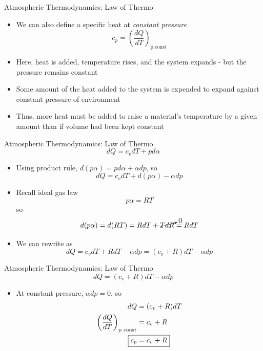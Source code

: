\begin{frame}{Atmospheric Thermodynamics:  Law of Thermo}
\begin{itemize}
	\item We can also define a specific heat at \textit{constant pressure}
	$$c_p = \left(\frac{dQ}{dT}\right)_{\text{p const}}$$
	\item Here, heat is added, temperature rises, and the system expands - but the pressure remains constant
	\item Some amount of the heat added to the system is expended to expand against constant pressure of environment
	\item Thus, more heat must be added to raise a material's temperature by a given amount than if volume had been kept constant
\end{itemize}
\end{frame}
\begin{frame}{Atmospheric Thermodynamics:  Law of Thermo}
$$dQ = c_vdT + pd\alpha$$
\begin{itemize}
	\item Using product rule, $d(p\alpha) = pd\alpha + \alpha dp$, so
	$$dQ = c_vdT + d(p\alpha) - \alpha dp$$
	\item Recall ideal gas law
	$$p\alpha = RT$$
	so
	$$d(p\alpha) = d(RT) = RdT + \cancelto{0}{TdR} = RdT$$
	\item We can rewrite as
	$$dQ = c_vdT + RdT - \alpha dp = (c_v + R)dT - \alpha dp$$ 
\end{itemize}
\end{frame}
\begin{frame}{Atmospheric Thermodynamics:  Law of Thermo}
$$dQ = (c_v + R)dT - \alpha dp$$ 
\begin{itemize}
	\item At constant pressure, $\alpha dp = 0$, so
	\begin{align*}
	dQ &= (c_v + R)dT\\
	\left(\frac{dQ}{dT}\right)_{\text{p const}} &= c_v + R\\
	\Aboxed{c_p &= c_v + R}
	\end{align*}
\end{itemize}
\end{frame}
